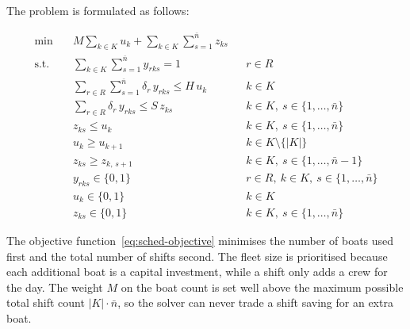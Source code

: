 \documentclass[12pt]{article}
\begin{document}
The problem is formulated as follows:

\begin{align}
  \min \quad & M \sum_{k \in K} u_k + \sum_{k \in K} \sum_{s = 1}^{\bar{n}} z_{ks} \label{eq:sched-objective}                                                                                 \\
  \text{s.t.} \quad
             & \sum_{k \in K} \sum_{s = 1}^{\bar{n}} y_{rks} = 1                                              &  & r \in R \label{eq:sched-assign}                                            \\
             & \sum_{r \in R} \sum_{s = 1}^{\bar{n}} \delta_r \, y_{rks} \leq H \, u_k                        &  & k \in K \label{eq:sched-day}                                               \\
             & \sum_{r \in R} \delta_r \, y_{rks} \leq S \, z_{ks}                                            &  & k \in K,\ s \in \{1, \ldots, \bar{n}\} \label{eq:sched-shift}              \\
             & z_{ks} \leq u_k                                                                                &  & k \in K,\ s \in \{1, \ldots, \bar{n}\} \label{eq:sched-link}               \\
             & u_k \geq u_{k+1}                                                                               &  & k \in K \setminus \{|K|\} \label{eq:sched-symmetry-boat}                   \\
             & z_{ks} \geq z_{k,\,s+1}                                                                        &  & k \in K,\ s \in \{1, \ldots, \bar{n} - 1\} \label{eq:sched-symmetry-shift} \\
             & y_{rks} \in \{0,1\}                                                                            &  & r \in R,\ k \in K,\ s \in \{1, \ldots, \bar{n}\} \label{eq:sched-y-binary} \\
             & u_k \in \{0,1\}                                                                                &  & k \in K \label{eq:sched-u-binary}                                          \\
             & z_{ks} \in \{0,1\}                                                                             &  & k \in K,\ s \in \{1, \ldots, \bar{n}\} \label{eq:sched-z-binary}
\end{align}

The objective function~\eqref{eq:sched-objective} minimises the number of boats used first and the total number of shifts second. The fleet size is prioritised because each additional boat is a capital investment, while a shift only adds a crew for the day. The weight \(M\) on the boat count is set well above the maximum possible total shift count \(|K| \cdot \bar{n}\), so the solver can never trade a shift saving for an extra boat.
\end{document}
